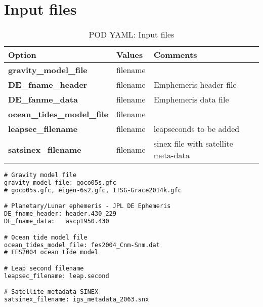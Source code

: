 \section{Input files}
\begin{table}[h!]
	\begin{tabular}{|p{4.5cm}|p{2cm}|p{3.5cm}|}
		\hline
		Option & Values & Comments \\
		\hline
        \textbf{gravity\_model\_file} & filename & \\
        \textbf{DE\_fname\_header} & filename &  Emphemeris header file \\
        \textbf{DE\_fanme\_data} & filename & Emphemeris data file \\
        \textbf{ocean\_tides\_model\_file} & filename & \\
        \textbf{leapsec\_filename} & filename & leapseconds to be added\\
        \textbf{satsinex\_filename} & filename & sinex file with satellite meta-data\\       
		\hline
	\end{tabular}
	\caption{POD YAML: Input files}
	\label{table:pod_yaml_input_files}
\end{table}
%
\begin{lstlisting}[language=xml,caption=yaml example for general input files]
# Gravity model file
gravity_model_file: goco05s.gfc  
# goco05s.gfc, eigen-6s2.gfc, ITSG-Grace2014k.gfc

# Planetary/Lunar ephemeris - JPL DE Ephemeris
DE_fname_header: header.430_229
DE_fname_data:   ascp1950.430

# Ocean tide model file
ocean_tides_model_file: fes2004_Cnm-Snm.dat 
# FES2004 ocean tide model

# Leap second filename
leapsec_filename: leap.second

# Satellite metadata SINEX
satsinex_filename: igs_metadata_2063.snx	
\end{lstlisting}
%

